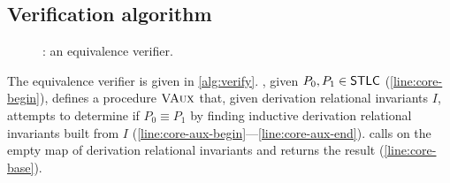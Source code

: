 \subsection{Verification algorithm}
\label{sec:verifier}
\begin{figure}
  \centering
\begin{algorithm}[H]
  {  \label{line:core-aux-end} %
    \Return{$\verifyaux(\emptyset)$} \label{line:core-base} } %
  \caption{%
    \verify: an equivalence verifier.
  }
  \label{alg:verify}
\end{algorithm}
\end{figure}

The equivalence verifier \verify is given in \autoref{alg:verify}.
%
\verify, given $P_0, P_1 \in \mathsf{STLC}$ (\autoref{line:core-begin}),
defines a procedure $\textsc{VAux}$ that, given derivation relational
invariants $I$, attempts to determine if $P_0 \equiv P_1$ by finding
inductive derivation relational invariants built from $I$
(\autoref{line:core-aux-begin}---\autoref{line:core-aux-end}).
%
\verify calls \verifyaux on the empty map of derivation relational
invariants and returns the result (\autoref{line:core-base}).

